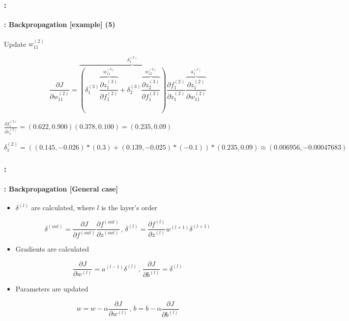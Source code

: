 \documentclass[xcolor=table]{beamer}
\begin{document}
\begin{frame}
	\frametitle{\insertshortsubtitle: \insertsection}
	\framesubtitle{\insertsubsection: Backpropagation [example] (5)}
	
	Update $w_{11}^{(2)}$
	
	\small
	
	\[
	\frac{\partial J}{\partial w_{11}^{(2)}} = 
	\overbrace{ 
		\left(
		\delta_{1}^{(3)} 
		\overbrace{
			\frac{\partial z_{1}^{(3)}}{\partial f_{1}^{(2)}}
		}^{w_{11}^{(3)}}
		+
		\delta_{2}^{(3)} 
		\overbrace{
			\frac{\partial z_{2}^{(3)}}{\partial f_{1}^{(2)}}
		}^{w_{12}^{(3)}}
		\right)
		\frac{\partial f_{1}^{(2)}}{\partial z_{1}^{(2)}}
	}^{\delta_{1}^{(2)}} 
	\overbrace{
		\frac{\partial z_{1}^{(2)}}{\partial w_{11}^{(2)}}
	}^{a_{1}^{(1)}}
	\]
	
	$
	\frac{\partial f_{1}^{(2)}}{\partial z_{1}^{(2)}} = (0.622, 0.900) (0.378, 0.100) = (0.235, 0.09)
	$
	
	$
	\delta_{1}^{(2)} = \left((0.145, -0.026) * (0.3) + (0.139, -0.025) * (-0.1)\right) * (0.235, 0.09) \approx (0.006956, -0.00047683)
	$
	
	

\end{frame}

\begin{frame}
	\frametitle{\insertshortsubtitle: \insertsection}
	\framesubtitle{\insertsubsection: Backpropagation [General case]}
	
	\begin{itemize}
		\item $\delta^{(l)}$  are calculated, where $l$ is the layer's order
	\end{itemize}
	
	\[ 
	\delta^{(out)} = 
	\frac{\partial J}{\partial f^{(out)}} \frac{\partial f^{(out)}}{\partial z^{(out)}}
	\,,\,
	\delta^{(l)} = \frac{\partial f^{(l)}}{\partial z^{(l)}} w^{(l+1)} \delta^{(l+1)}
	\]
	
	\begin{itemize}
		\item Gradients are calculated
	\end{itemize}
	
	\[ 
	\frac{\partial J}{\partial w^{(l)}} = a^{(l-1)} \delta^{(l)}
	\,,\,
	\frac{\partial J}{\partial b^{(l)}} = \delta^{(l)}
	\]
	
	\begin{itemize}
		\item Parameters are updated
	\end{itemize}
	
	\[ 
	w = w - \alpha \frac{\partial J}{\partial w^{(l)}}
	\,,\,
	b = b - \alpha \frac{\partial J}{\partial b^{(l)}}
	\]

\end{frame}
\end{document}
